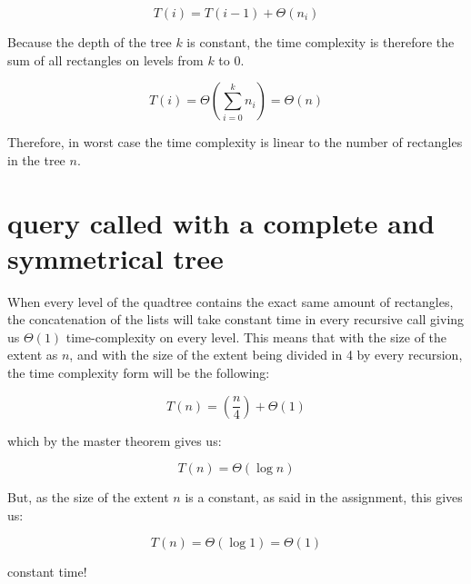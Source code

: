 \documentclass[12pt, a4paper]{article}
\begin{document}
$$T(i) = T(i-1) + \Theta(n_i)$$

Because the depth of the tree $k$ is constant, the time complexity is therefore the sum of all rectangles on levels from $k$ to $0$.

$$T(i) = \Theta(\sum_{i=0}^kn_i) = \Theta(n) $$

Therefore, in worst case the time complexity is linear to the number of rectangles in the tree $n$.

\section{query called with a complete and symmetrical tree}

When every level of the quadtree contains the exact same amount of rectangles, the concatenation of the lists will take constant time in every recursive call giving us $\Theta(1)$ time-complexity on every level. This means that with the size of the extent as $n$, and with the size of the extent being divided in 4 by every recursion, the time complexity form will be the following:

 $$T(n)=\left(\frac{n}{4}\right)+\Theta(1)$$

which by the master theorem gives us:

 $$T(n)=\Theta(\log n)$$

But, as the size of the extent $n$ is a constant, as said in the assignment, this gives us:

 $$T(n)=\Theta(\log 1)=\Theta(1)$$

constant time!
\end{document}

